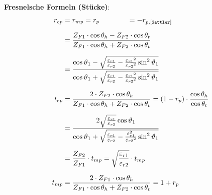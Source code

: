 \textbf{Fresnelsche Formeln (Stücke)}:
\begin{equation*}
		\setlength{\jot}{10pt}
	\begin{aligned}
		r_{ep}    & =  r_{mp} = r_{p}  \qquad \qquad =-r_{p,[\texttt{Sattler}]}
		\\
		& = \frac{Z_{F1} \cdot \cos \theta_h-Z_{F2} \cdot \cos \theta_t}{Z_{F1} \cdot \cos \theta_h+Z_{F2} \cdot \cos \theta_t}
		\\
		& =\frac{\cos \vartheta_1-\sqrt{\frac{\varepsilon_{r 1}}{\varepsilon_{r 2}}-\frac{\varepsilon_{r 1}{ }^2}{\varepsilon_{r 2}{ }^2} \sin ^2 \vartheta_1}}{\cos \vartheta_1+\sqrt{\frac{\varepsilon_{r 1}}{\varepsilon_{r 2}}-\frac{\varepsilon_{r 1}{ }^2}{\varepsilon_{r 2}{ }^2} \sin ^2 \vartheta_1}} \\
		t_{ep} & =  \frac{2 \cdot Z_{F2}   \cdot  \cos \theta_h}{Z_{F1} \cdot \cos \theta_h+Z_{F2} \cdot \cos \theta_t}                                                                                                                           = (1-r_p) \cdot \dfrac{\cos \theta_h}{\cos \theta_t}                                                                                                                                                                        \\
		& = \frac{2 \sqrt{\frac{\varepsilon_{r 1}}{\varepsilon_{r 2}}} \cos \vartheta_1}{\cos \vartheta_1+\sqrt{\frac{\varepsilon_{r 1}}{\varepsilon_{r 2}}-\frac{\varepsilon_{r 1}^2}{\varepsilon_{r 2}{ }^2} \sin ^2 \vartheta_1}} \\
		& = \frac{Z_{F2}}{Z_{F1}}\cdot t_{mp} = \sqrt{\frac{\varepsilon_{r1}}{\varepsilon_{r2}}}\cdot t_{mp} \\
		t_{mp} & = \frac{2 \cdot  Z_{F1}\cdot \cos \theta_h}{Z_{F1} \cdot \cos \theta_h+Z_{F2} \cdot \cos \theta_t}                                                                                                                          
		= 1+r_p                                                                                                                                                                                                                
	\end{aligned}
\end{equation*}
